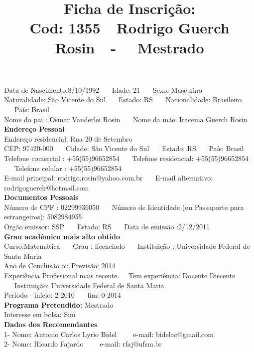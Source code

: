 \documentclass[11pt]{article}
\title{\vspace*{-4cm} Ficha de Inscrição: \\Cod: 1355\ \ Rodrigo Guerch Rosin\ \ - \ \ Mestrado 
 }
\date{}
\begin{document}
\maketitle
\vspace*{-1.5cm}
\noindent Data de Nascimento:8/10/1992
\ \ \ Idade: 21   \ \ \ Sexo: Masculino
\\
Naturalidade: São Vicente do Sul  
\ \ \  Estado: RS
\ \ \  Nacionalidade: Brasileiro
\ \ \ País: Brasil
\\        
Nome do pai : Osmar Vanderlei Rosin
\ \ \ Nome da mãe: Iracema Guerch Rosin          
\\[0.2cm]                     
\textbf{Endereço Pessoal} 
\\ 
\noindent Endereço residencial: Rua 20 de Setembro
\\
        CEP: 97420-000 
\ \ \ Cidade: São Vicente do Sul 
\ \ \ Estado: RS 
\ \ \ País: Brasil
\\		
		Telefone comercial : +55(55)96652854
\ \ \ Telefone residencial: +55(55)96652854
\ \ \ Telefone celular : +55(55)96652854
\\
E-mail principal: rodrigo.rosin@yahoo.com.br
\ \ \ E-mail alternativo: rodrigoguerch@hotmail.com 
\\[0.2cm] 
\textbf{Documentos Pessoais}
\\
\noindent Número de CPF : 02299936050
\ \ \ Número de Identidade (ou Passaporte para estrangeiros): 5082984955
\\
Orgão emissor: SSP
\ \ \ Estado: RS
\ \ \ Data de emissão :2/12/2011
\\[0.3cm]
\textbf{Grau acadêmico mais alto obtido}
\\	
Curso:Matemática
\ \ \ Grau : licenciado
\ \ \ Instituição : Universidade Federal de Santa Maria
\\			
Ano de Conclusão ou Previsão: 2014
\\ 
Experiência Profissional mais recente. \ \  
Tem experiência: Docente Discente  
\ \ \ Instituição: Universidade Federal de Santa Maria
\\  
Período - início: 2-2010
\ \ \ fim: 0-2014
\\[0.2cm] 
\textbf{Programa Pretendido:} Mestrado\\
Interesse em bolsa: Sim
\\[0.3cm]		
\textbf{Dados dos Recomendantes} 
\\
1- Nome: Antonio Carlos Lyrio Bidel
\ \ \ \  e-mail: bidelac@gmail.com 
\\
2- Nome: Ricardo Fajardo
\ \ \ \ e-mail: rfaj@ufsm.br
\end{document}
